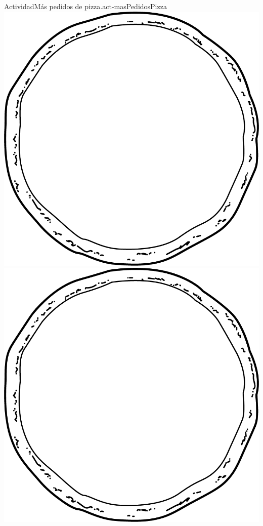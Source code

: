 \documentclass[20pt]{extarticle}
\begin{document}
\begin{activity}{Actividad}{Más pedidos de pizza.}{act-masPedidosPizza}%
\vspace{1.5cm}
\includegraphics[width=\linewidth, center]{external/png-source/pizza-draw.png}
\newpage
\vspace*{2.5cm}
\includegraphics[width=\linewidth, center]{external/png-source/pizza-draw.png}

\end{activity}
\end{document}
